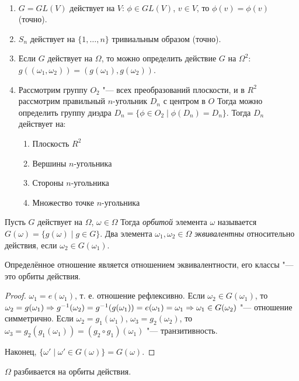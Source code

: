 \documentclass[main]{subfiles}
\begin{document}
\begin{examples}~
  \begin{enumerate}
    \item $G = GL(V)$ действует на $V$:
      $\phi \in GL(V)$, $v \in V$,
      то $\phi(v) = \phi(v)$ (точно).
    \item $S_n$ действует на $\{ 1, \dots, n \}$
      тривиальным образом (точно).
    \item Если $G$ действует на $\Omega$,
      то можно определить действие $G$ на $\Omega^2$:
      $g((\omega_1, \omega_2)) = (g(\omega_1), g(\omega_2))$.
    \item Рассмотрим группу $O_2$ "--- всех преобразований плоскости, и в
      $R^2$ рассмотрим правильный $n$-угольник $D_n$ с центром в $O$ Тогда можно
      определить группу диэдра $D_n = \{ \phi \in O_2 \mid \phi(D_n) = D_n \}$.
      Тогда $D_n$ действует на:
      \begin{enumerate}
	\item Плоскость $R^2$
	\item Вершины $n$-угольника
	\item Стороны $n$-угольника
	\item Множество точке $n$-угольника
      \end{enumerate}
  \end{enumerate}
\end{examples}

\begin{definition}
  Пусть $G$ действует на $\Omega$, $\omega \in \Omega$
  Тогда \emph{орбитой} элемента $\omega$
  называется
  $G(\omega) = \{ g(\omega) \mid g \in G \}$.
  Два элемента $\omega_1, \omega_2 \in \Omega$
  \emph{эквивалентны} относительно действия,
  если $\omega_2 \in G(\omega_1)$.
\end{definition}

\begin{proposition}
  Определённое отношение является отношением эквивалентности, его классы "---
  это орбиты действия.
\end{proposition}
\begin{proof}
  $\omega_1 = e(\omega_1)$, т. е. отношение рефлексивно.
  Если $\omega_2 \in G(\omega_1)$,
  то $\omega_2 = g(\omega_1) \Rightarrow
  g^{-1}(\omega_2) = g^{-1}(g(\omega_1)) =
  e(\omega_1) = \omega_1 \Rightarrow \omega_1 \in G(\omega_2)$ "---
  отношение симметрично. Если $\omega_2 = g_1(\omega_1)$, $\omega_3 =
  g_2(\omega_2)$, то $\omega_3 = g_2(g_1(\omega_1)) = (g_2 \circ g_1)
  (\omega_1)$ "--- транзитивность.

  Наконец, $\{ \omega' \mid \omega' \in G(\omega)\} = G(\omega)$.
\end{proof}
\begin{corollary}
  $\Omega$ разбивается на орбиты действия.
\end{corollary}
\end{document}
